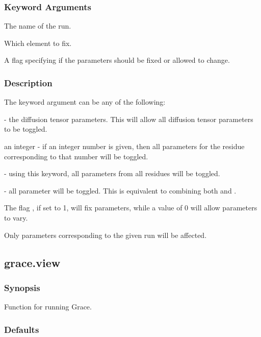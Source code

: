 \subsubsection{Keyword Arguments}


  The name of the run.

  Which element to fix.

  A flag specifying if the parameters should be fixed or allowed to change.

\subsubsection{Description}

The keyword argument 
 can be any of the following:

 - the diffusion tensor  parameters.  This will allow all diffusion tensor  parameters
to be toggled.

an integer - if an integer number is given, then all parameters for the residue
corresponding to that number will be toggled.

 - using this keyword, all parameters from all residues will be toggled.

 - all parameter will be toggled.  This is equivalent to combining both 
 and
.


The flag 
, if set to 1, will fix parameters, while a value of 0 will allow parameters
to vary.


Only parameters corresponding to the given run will be affected.


\newpage

\subsection{grace.view}


\subsubsection{Synopsis}

Function for running Grace.

\subsubsection{Defaults}

